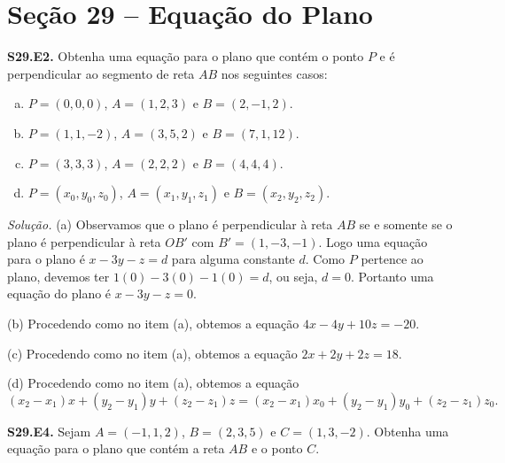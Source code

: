 \documentclass[a4paper,11pt]{article}
\begin{document}
\section*{Seção 29 -- Equação do Plano}

\textbf{S29.E2.}
Obtenha uma equação para o plano que contém o ponto $P$ e é perpendicular ao segmento de reta $AB$ nos seguintes casos:
\begin{enumerate}[(a)]
  \item
    $P = (0,0,0)$, $A = (1,2,3)$ e $B = (2,-1,2)$.
  \item
    $P = (1,1,-2)$, $A = (3,5,2)$ e $B = (7,1,12)$.
  \item
    $P = (3,3,3)$, $A = (2,2,2)$ e $B = (4,4,4)$.
  \item
    $P = (x_0, y_0, z_0)$, $A = (x_1,y_1,z_1)$ e $B = (x_2,y_2,z_2)$.
\end{enumerate}

\vspace{\baselineskip}

\emph{Solução.}
(a)
Observamos que o plano é perpendicular à reta $AB$ se e somente se o plano é perpendicular à reta $OB'$ com $B' = (1,-3,-1)$.
Logo uma equação para o plano é $x - 3y - z = d$ para alguma constante $d$.
Como $P$ pertence ao plano, devemos ter $1(0) - 3(0) -1(0) = d$, ou seja, $d=0$.
Portanto uma equação do plano é $x - 3y - z = 0$.

(b)
Procedendo como no item (a), obtemos a equação $4x - 4y + 10z = -20$.

(c)
Procedendo como no item (a), obtemos a equação $2x + 2y + 2z = 18$.

(d)
Procedendo como no item (a), obtemos a equação
\[
  (x_2 - x_1)x + (y_2 - y_1)y + (z_2 - z_1)z = (x_2 - x_1)x_0 + (y_2 - y_1)y_0 + (z_2 - z_1)z_0.
\]

\vspace{\baselineskip}

\textbf{S29.E4.}
Sejam $A = (-1,1,2)$, $B = (2,3,5)$ e $C = (1,3,-2)$.
Obtenha uma equação para o plano que contém a reta $AB$ e o ponto $C$.

\vspace{\baselineskip}
\end{document}

